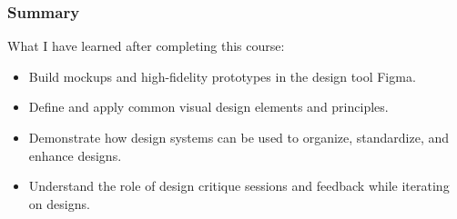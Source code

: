 \subsubsection{Summary}
\begin{flushleft}
	What I have learned after completing this course:
	\begin{itemize}
		\item Build mockups and high-fidelity prototypes in the design tool Figma.
		\item Define and apply common visual design elements and principles.
		\item Demonstrate how design systems can be used to organize, standardize, and enhance designs.
		\item Understand the role of design critique sessions and feedback while iterating on designs.
	\end{itemize}
\end{flushleft}

